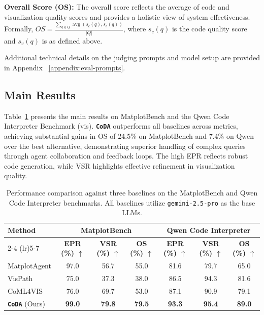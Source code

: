 \documentclass[11pt, a4paper, logo, copyright]{googlecloud}
\newcommand{\methodname}{\textbf{\texttt{\textcolor{StarIndigo}{C}\textcolor{StarIndigo}{o}\textcolor{StarCoral}{D}\textcolor{StarTeal}{A}}}}
\newcommand{\io}[1]{\setlength{\fboxsep}{1pt}\colorbox{gray!10}{\texttt{#1}}}
\newcommand{\best}[1]{\setlength{\fboxsep}{2.5pt}\colorbox{StarTeal!18}{\textbf{#1}}}
\begin{document}
\textbf{Overall Score (OS):} The overall score reflects the average of code and visualization quality scores and provides a holistic view of system effectiveness. Formally, $OS = \frac{\sum_{q \in Q} \operatorname{avg}(s_c(q), s_v(q))}{|Q|}$, where $s_c(q)$ is the code quality score and $s_v(q)$ is as defined above. 


Additional technical details on the judging prompts and model setup are provided in Appendix ~\ref{appendix:eval-prompts}.


\subsection{Main Results}\label{main_results}
Table~\ref{tab:main-results} presents the main results on MatplotBench and the Qwen Code Interpreter Benchmark (vis). \methodname{} outperforms all baselines across metrics, achieving substantial gains in OS of 24.5\% on MatplotBench and 7.4\% on Qwen over the best alternative, demonstrating superior handling of complex queries through agent collaboration and feedback loops. 
The high EPR reflects robust code generation, while VSR highlights effective refinement in visualization quality.



\begin{table}[t]
\caption{Performance comparison against three baselines on the MatplotBench and Qwen Code Interpreter benchmarks. All baselines utilize \io{gemini-2.5-pro} as the base LLMs.}
\label{tab:main-results}
\centering
\small
\setlength{\tabcolsep}{4.5pt} 
\begin{tabular}{@{}lccc|ccc@{}}
\toprule
\multirow{2}{*}{\textbf{Method}} & \multicolumn{3}{c}{\textbf{MatplotBench}} & \multicolumn{3}{c}{\textbf{Qwen Code Interpreter}} \\
\cmidrule(lr){2-4} \cmidrule(lr){5-7}
 & \textbf{EPR (\%) $\uparrow$} & \textbf{VSR (\%) $\uparrow$} & \textbf{OS (\%) $\uparrow$} & \textbf{EPR (\%) $\uparrow$} & \textbf{VSR (\%) $\uparrow$} & \textbf{OS (\%) $\uparrow$} \\
\midrule
MatplotAgent        & 97.0 & 56.7 & 55.0 & 81.6 & 79.7 & 65.0 \\
VisPath             & 75.0 & 37.3 & 38.0 & 86.5 & 94.3 & 81.6 \\
CoML4VIS            & 76.0 & 69.7 & 53.0 & 87.1 & 90.9 & 79.1 \\ \midrule
\methodname{} (Ours)& \best{99.0} & \best{79.8} & \best{79.5} & \best{93.3} & \best{95.4} & \best{89.0} \\
\bottomrule
\end{tabular}%

\end{table}
\end{document}
